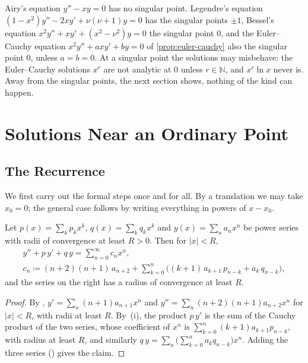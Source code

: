 Airy's equation $y''-xy=0$ has no singular point. Legendre's equation $(1-x^2)y''-2xy'+\nu(\nu+1)y=0$ has the singular points $\pm1$, Bessel's equation $x^2y''+xy'+(x^2-\nu^2)y=0$ the singular point $0$, and the Euler--Cauchy equation $x^2y''+axy'+by=0$ of \cref{prop:euler-cauchy} also the singular point $0$, unless $a=b=0$. At a singular point the solutions may misbehave: the Euler--Cauchy solutions $x^r$ are not analytic at $0$ unless $r\in\mathbb N$, and $x^r\ln x$ never is. Away from the singular points, the next section shows, nothing of the kind can happen.

\section{Solutions Near an Ordinary Point}
\label{sec:ordinary-points}

\subsection{The Recurrence}

We first carry out the formal steps once and for all. By a translation we may take $x_0=0$; the general case follows by writing everything in powers of $x-x_0$.

\begin{lemma}
\label{lem:series-substitution}
Let $p(x)=\sum_kp_kx^k$, $q(x)=\sum_kq_kx^k$ and $y(x)=\sum_na_nx^n$ be power series with radii of convergence at least $R>0$. Then for $|x|<R$,
\begin{gather*}
y''+p\,y'+q\,y=\sum_{n=0}^\infty c_nx^n,\\
c_n\coloneqq(n+2)(n+1)\,a_{n+2}+\sum_{k=0}^n\bigl((k+1)\,a_{k+1}\,p_{n-k}+a_k\,q_{n-k}\bigr),
\end{gather*}
and the series on the right has a radius of convergence at least $R$.
\end{lemma}

\begin{proof}
By , $y'=\sum_n(n+1)a_{n+1}x^n$ and $y''=\sum_n(n+2)(n+1)a_{n+2}x^n$ for $|x|<R$, with radii at least $R$. By \,(i), the product $p\,y'$ is the sum of the Cauchy product of the two series, whose coefficient of $x^n$ is $\sum_{k=0}^n(k+1)a_{k+1}p_{n-k}$, with radius at least $R$, and similarly $q\,y=\sum_n\bigl(\sum_{k=0}^na_kq_{n-k}\bigr)x^n$. Adding the three series () gives the claim.
\end{proof}

